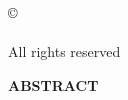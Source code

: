 \documentclass[letterpaper,12pt,oneside,texlive=2018]{memoir} %
\begin{document}
\clearpage
\thispagestyle{empty}
\TitleColumbia

\newpage
{}
\clearpage
\thispagestyle{empty}
\begin{center}
\vspace*{7.5 in} %
© \yearText{} \\
\myName{} \\
All rights reserved
\end{center} %

\newpage
{}
\clearpage
\thispagestyle{empty}
\begin{center}
  \large
  \textbf{ABSTRACT}\\ %
  \bigskip
  \textbf{\thesisTitle} \\ %
  \bigskip
  \myName \\ %
  \bigskip
\end{center}
\abstractText{}

\frontmatter %

\tableofcontents* %
\end{document}
